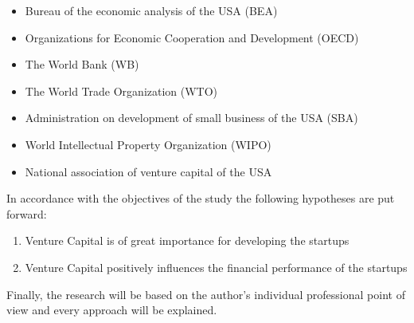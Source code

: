 \begin{itemize}
    \item Bureau of the economic analysis of the USA (BEA)
    \item Organizations for Economic Cooperation and Development (OECD)
    \item The World Bank (WB)
    \item The World Trade Organization (WTO)
    \item Administration on development of small business of the USA (SBA)
    \item World Intellectual Property Organization (WIPO)
    \item National association of venture capital of the USA
\end{itemize}

In accordance with the objectives of the study the following hypotheses are put forward:
\begin{enumerate}
    \item Venture Capital is of great importance for developing the startups
    \item Venture Capital positively influences the financial performance of the startups
\end{enumerate}
Finally, the research will be based on the author’s individual professional point of view and every approach will be explained.


